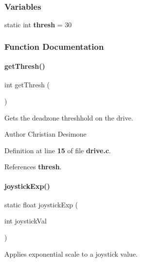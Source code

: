 \subsubsection*{Variables}
\begin{DoxyCompactItemize}
\item 
static int \textbf{ thresh} = 30
\end{DoxyCompactItemize}


\subsubsection{Function Documentation}
\mbox{\label{drive_8c_a9caa5e772598f9182c9ec84cf8c351ee}} 
\paragraph{get\+Thresh()}
{\footnotesize\ttfamily int get\+Thresh (\begin{DoxyParamCaption}{ }\end{DoxyParamCaption})}



Gets the deadzone threshhold on the drive. 

\begin{DoxyAuthor}{Author}
Christian Desimone 
\end{DoxyAuthor}


Definition at line \textbf{ 15} of file \textbf{ drive.\+c}.



References \textbf{ thresh}.

\mbox{\label{drive_8c_a6de4fbb9197f2f350c53a9f8bf23a8f1}} 
\paragraph{joystick\+Exp()}
{\footnotesize\ttfamily static float joystick\+Exp (\begin{DoxyParamCaption}\item[{int}]{joystick\+Val }\end{DoxyParamCaption})\hspace{0.3cm}{\ttfamily [static]}}



Applies exponential scale to a joystick value. 

